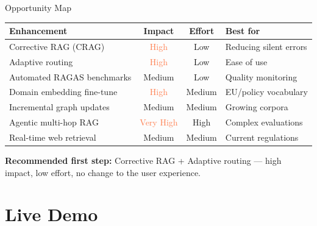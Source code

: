 \documentclass[aspectratio=169,11pt]{beamer}
\begin{document}
\begin{frame}{Opportunity Map}
  \vspace{0.1cm}
  \centering
  \renewcommand{\arraystretch}{1.45}
  \begin{tabular}{p{4cm}ccp{3.8cm}}
    \toprule
    \textbf{Enhancement} &
    \textbf{Impact} &
    \textbf{Effort} &
    \textbf{Best for} \\
    \midrule
    Corrective RAG (CRAG)      & \textcolor{coral}{High}   & Low    & Reducing silent errors \\
    Adaptive routing           & \textcolor{coral}{High}   & Low    & Ease of use \\
    Automated RAGAS benchmarks & Medium & Low    & Quality monitoring \\
    Domain embedding fine-tune & \textcolor{coral}{High}   & Medium & EU/policy vocabulary \\
    Incremental graph updates  & Medium & Medium & Growing corpora \\
    Agentic multi-hop RAG      & \textcolor{coral}{Very High} & High & Complex evaluations \\
    Real-time web retrieval    & Medium & Medium & Current regulations \\
    \bottomrule
  \end{tabular}
  \vspace{0.5em}
  \begin{center}
    \colorbox{lightcoral!60}{%
      \parbox{0.82\textwidth}{\centering\small
        \textbf{Recommended first step:}
        Corrective RAG + Adaptive routing —
        high impact, low effort, no change to the user experience.
      }%
    }
  \end{center}
\end{frame}

\section{Live Demo}
\end{document}
